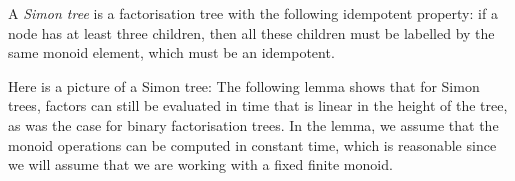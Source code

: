 \begin{definition} A \emph{Simon tree} is a factorisation tree with the following idempotent property: if a node has at least three children, then all these children  must be labelled by the same monoid element, which  must be an idempotent.
\end{definition}
Here is a picture of a Simon tree:
The following lemma shows that for Simon trees, factors can still be evaluated in time that is linear in the height of the tree, as was the case for binary factorisation trees. In the lemma, we assume that the monoid operations can be computed in constant time, which is reasonable since we will assume that we are working with a fixed finite monoid.

